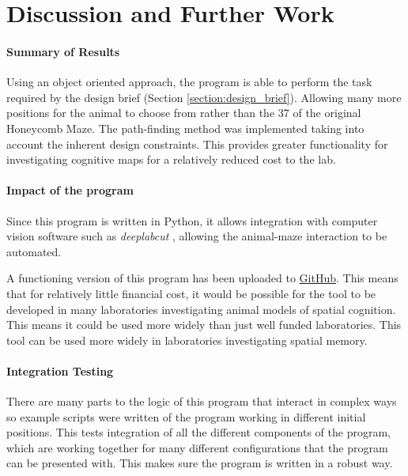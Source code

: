 \section{Discussion and Further Work}

\paragraph{Summary of Results}

Using an object oriented approach, the program is able to perform the task required by the design brief (Section \ref{section:design_brief}). Allowing many more positions for the animal to choose from rather than the 37 of the original Honeycomb Maze. The path-finding method was implemented taking into account the inherent design constraints. This provides greater functionality for investigating cognitive maps for a relatively reduced cost to the lab.


\paragraph{Impact of the program}

Since this program is written in Python, it allows integration with computer vision software such as \textit{deeplabcut} \cite{dlc}, allowing the animal-maze interaction to be automated.

A functioning version of this program has been uploaded to \href{https://github.com/casualcoffeeaddict/Honeycomb-Maze}{GitHub}. This means that for relatively little financial cost, it would be possible for the tool to be developed in many laboratories investigating animal models of spatial cognition. This means it could be used more widely than just well funded laboratories. This tool can be used more widely in laboratories investigating spatial memory.  

\paragraph{Integration Testing}

There are many parts to the logic of this program that interact in complex ways so example scripts were written of the program working in different initial positions. This tests integration of all the different components of the program, which are working together for many different configurations that the program can be presented with. This makes sure the program is written in a robust way.

